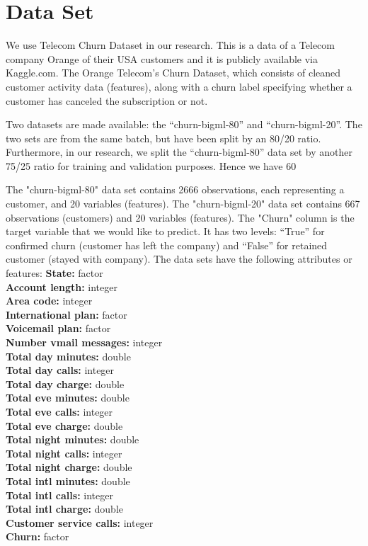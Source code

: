 \section{Data Set}\label{dataset}

We use Telecom Churn Dataset in our research. This is a data of a Telecom company Orange of their USA customers and it is publicly available via Kaggle.com. 
The Orange Telecom's Churn Dataset, which consists of cleaned customer activity data (features), along with a churn label specifying whether a customer has canceled the subscription or not.

Two datasets are made available: the “churn-bigml-80” and “churn-bigml-20”. The two sets are from the same batch, but have been split by an 80/20 ratio. Furthermore, in our research, we split the “churn-bigml-80” data set by another 75/25 ratio for training and validation purposes. Hence we have 60%

The "churn-bigml-80" data set contains 2666 observations, each representing a customer, and 20 variables (features). The "churn-bigml-20" data set contains 667 observations (customers) and 20 variables (features). The "Churn" column is the target variable that we would like to predict. It has two levels: “True” for confirmed churn (customer has left the company) and “False” for retained customer (stayed with company). \newline
\newline
The data sets have the following attributes or features: \newline \newline
\textbf {State:} factor	\\
\textbf {Account length:} integer \\
\textbf {Area code:} integer \\
\textbf {International plan:} factor \\
\textbf {Voicemail plan:} factor \\
\textbf {Number vmail messages:} integer\\
\textbf {Total day minutes:} double \\
\textbf {Total day calls:} integer \\   
\textbf {Total day charge:} double \\
\textbf {Total eve minutes:} double \\
\textbf {Total eve calls:} integer \\
\textbf {Total eve charge:} double \\
\textbf {Total night minutes:} double \\ 
\textbf {Total night calls:} integer \\
\textbf {Total night charge:} double \\
\textbf {Total intl minutes:} double \\ 
\textbf {Total intl calls:} integer \\
\textbf {Total intl charge:} double \\
\textbf {Customer service calls:} integer \\
\textbf {Churn:} factor \\

